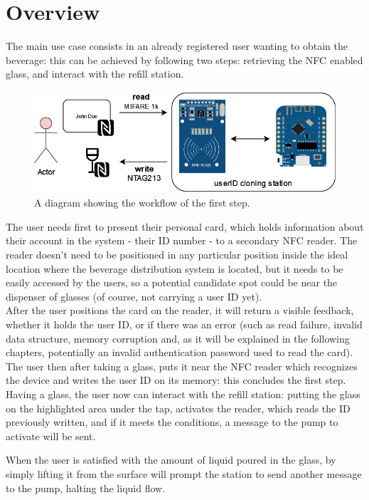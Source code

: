 \documentclass[target=bach,aauheader=,style=]{thud}
\begin{document}
\section{Overview}
The main use case consists in an already registered user wanting to obtain the beverage: this can be achieved by following two steps: retrieving the NFC enabled glass, and interact with the refill station.


\begin{figure}[h!]
	\centering
	\includegraphics[width=.70\textwidth]{clone}
	\caption{A diagram showing the workflow of the first step.}
	\label{fig:clone}
\end{figure} 
The user needs first to present their personal card, which holds information about their account in the system - their ID number - to a secondary NFC reader. The reader doesn't need to be positioned in any particular position inside the ideal location where the beverage distribution system is located, but it needs to be easily accessed by the users, so a potential candidate spot could be near the dispenser of glasses (of course, not carrying a user ID yet).\\

After the user positions the card on the reader, it will return a visible feedback, whether it holds the user ID, or if there was an error (such as read failure, invalid data structure, memory corruption and, as it will be explained in the following chapters, potentially an invalid authentication password used to read the card). The user then after taking a glass, puts it near the NFC reader which recognizes the device and writes the user ID on its memory: this concludes the first step.\\

Having a glass, the user now can interact with the refill station: putting the glass on the highlighted area under the tap, activates the reader, which reads the ID previously written, and if it meets the conditions, a message to the pump to activate will be sent.

When the user is satisfied with the amount of liquid poured in the glass, by simply lifting it from the surface will prompt the station to send another message to the pump, halting the liquid flow.
\end{document}
